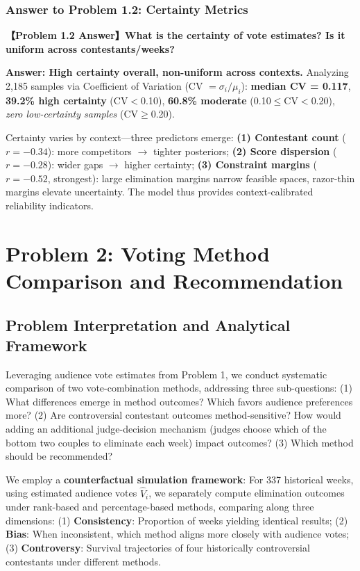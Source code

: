 \subsubsection{Answer to Problem 1.2: Certainty Metrics}

\begin{answerbox}
\noindent\textbf{【Problem 1.2 Answer】What is the certainty of vote estimates? Is it uniform across contestants/weeks?}

\textbf{Answer: High certainty overall, non-uniform across contexts.} Analyzing 2,185 samples via Coefficient of Variation (CV $= \sigma_i/\mu_i$): \textbf{median CV = 0.117}, \textbf{39.2\% high certainty} (CV$<$0.10), \textbf{60.8\% moderate} (0.10$\leq$CV$<$0.20), \textit{zero low-certainty samples} (CV$\geq$0.20).

Certainty varies by context---three predictors emerge: \textbf{(1) Contestant count} ($r=-0.34$): more competitors $\rightarrow$ tighter posteriors; \textbf{(2) Score dispersion} ($r=-0.28$): wider gaps $\rightarrow$ higher certainty; \textbf{(3) Constraint margins} ($r=-0.52$, strongest): large elimination margins narrow feasible spaces, razor-thin margins elevate uncertainty. The model thus provides context-calibrated reliability indicators.
\end{answerbox}

\section{Problem 2: Voting Method Comparison and Recommendation}

\subsection{Problem Interpretation and Analytical Framework}

Leveraging audience vote estimates from Problem 1, we conduct systematic comparison of two vote-combination methods, addressing three sub-questions: (1) What differences emerge in method outcomes? Which favors audience preferences more? (2) Are controversial contestant outcomes method-sensitive? How would adding an additional judge-decision mechanism (judges choose which of the bottom two couples to eliminate each week) impact outcomes? (3) Which method should be recommended?

We employ a \textbf{counterfactual simulation framework}: For 337 historical weeks, using estimated audience votes $\hat{V}_i$, we separately compute elimination outcomes under rank-based and percentage-based methods, comparing along three dimensions: (1) \textbf{Consistency}: Proportion of weeks yielding identical results; (2) \textbf{Bias}: When inconsistent, which method aligns more closely with audience votes; (3) \textbf{Controversy}: Survival trajectories of four historically controversial contestants under different methods.

